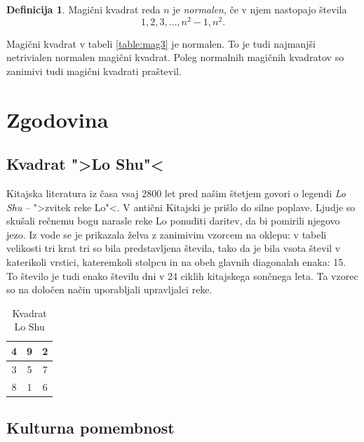 \documentclass[a4paper,12pt]{article}
\newcommand{\pojem}[1]{\emph{#1\color{purple}}}
\newenvironment{magic}[3]{\begin{table}[!ht]
   \centering
   \caption{#1}
   \label{#2}
   \large
   \begin{tabular}{|*{#3}{c|}}
   \hline}{\end{tabular}
   \normalsize
\end{table}}
\theoremstyle{definition}
\newtheorem{definicija}{Definicija}
\theoremstyle{plain}
\begin{document}
\begin{definicija}
   Magični kvadrat reda \(n\) je \pojem{normalen\color{purple}}, če v njem nastopajo števila
   \begin{equation}
      \label{eq:numbers}
      1, 2, 3, \ldots, n^2-1, n^2.
   \end{equation}
\end{definicija}

Magični kvadrat v tabeli \ref{table:mag3} je normalen.
To je tudi najmanjši netrivialen normalen magični kvadrat.
Poleg normalnih magičnih kvadratov so zanimivi tudi magični kvadrati praštevil.


\section{Zgodovina}

\subsection{Kvadrat ">Lo Shu"<}

Kitajska literatura iz časa vsaj 2800 let pred našim štetjem govori o legendi
\emph{Lo Shu\color{purple}} -- ">zvitek reke Lo"<. V antični Kitajski je prišlo do
silne poplave. Ljudje so skušali rečnemu bogu narasle reke Lo ponuditi daritev,
da bi pomirili njegovo jezo. Iz vode se je prikazala želva z zanimivim vzorcem
na oklepu: v tabeli velikosti tri krat tri so bila predstavljena števila, tako
da je bila vsota števil v katerikoli vrstici, kateremkoli stolpcu in na obeh
glavnih diagonalah enaka: 15. To število je tudi enako številu dni v 24 ciklih
kitajskega sončnega leta. Ta vzorec so na določen način uporabljali upravljalci
reke.

\begin{magic}{Kvadrat Lo Shu}{table:loshu}{3}
   4 & 9 & 2 \\\hline
   3 & 5 & 7 \\\hline
   8 & 1 & 6 \\\hline
\end{magic}


\subsection{Kulturna pomembnost}
\end{document}
